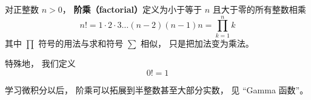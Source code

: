 
\begin{issues}
\issueDraft
\end{issues}

对正整数 $n > 0$， \textbf{阶乘（factorial）}定义为小于等于 $n$ 且大于零的所有整数相乘
\begin{equation}
n! = 1 \cdot 2 \cdot 3 \dots (n - 2) (n - 1)n = \prod_{k = 1}^n k
\end{equation}
其中 $\prod$ 符号的用法与求和符号 $\sum$ 相似， 只是把加法变为乘法。 %

特殊地， 我们定义
\begin{equation}
0! = 1
\end{equation}

学习微积分以后， 阶乘可以拓展到半整数甚至大部分实数， 见 “Gamma 函数”。
